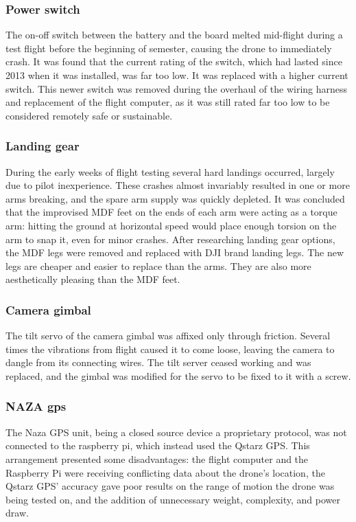 \documentclass{article}
\begin{document}
		\subsubsection{Power switch}
The on-off switch between the battery and the board melted mid-flight during a test flight before the beginning of semester, causing the drone to immediately crash. It was found that the current rating of the switch, which had lasted since 2013 when it was installed, was far too low. It was replaced with a higher current switch. This newer switch was removed during the overhaul of the wiring harness and replacement of the flight computer, as it was still rated far too low to be considered remotely safe or sustainable.

		\subsubsection{Landing gear}
During the early weeks of flight testing several hard landings occurred, largely due to pilot inexperience. These crashes almost invariably resulted in one or more arms breaking, and the spare arm supply was quickly depleted. It was concluded that the improvised MDF feet on the ends of each arm were acting as a torque arm: hitting the ground at horizontal speed would place enough torsion on the arm to snap it, even for minor crashes. After researching landing gear options, the MDF legs were removed and replaced with DJI brand landing legs. The new legs are cheaper and easier to replace than the arms. They are also more aesthetically pleasing than the MDF feet.

		\subsubsection{Camera gimbal}
The tilt servo of the camera gimbal was affixed only through friction. Several times the vibrations from flight caused it to come loose, leaving the camera to dangle from its connecting wires. The tilt server ceased working and was replaced, and the gimbal was modified for the servo to be fixed to it with a screw.

		\subsubsection{NAZA gps}
The Naza GPS unit, being a closed source device a proprietary protocol, was not connected to the raspberry pi, which instead used the Qstarz GPS. This arrangement presented some disadvantages: the flight computer and the Raspberry Pi were receiving conflicting data about the drone’s location, the Qstarz GPS’ accuracy gave poor results on the range of motion the drone was being tested on, and the addition of unnecessary weight, complexity, and power draw.
\end{document}
